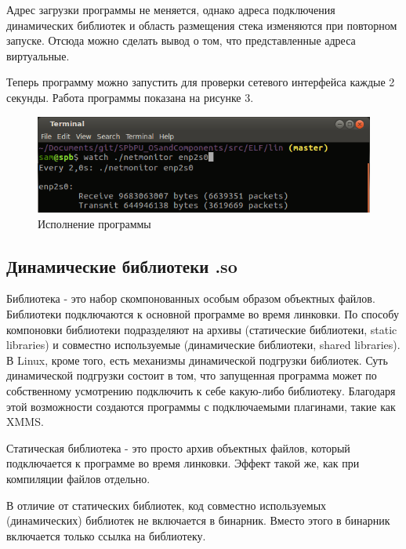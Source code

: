 

Адрес загрузки программы не меняется, однако адреса подключения динамических библиотек и область размещения стека изменяются при повторном запуске. Отсюда можно сделать вывод о том, что представленные адреса виртуальные.

Теперь программу можно запустить для проверки сетевого интерфейса каждые 2 секунды. Работа программы показана на рисунке 3.

\begin{figure}[H]
 \centering
 \includegraphics[scale=0.85]{res/lin_003}
 \caption{Исполнение программы}
\end{figure}

\subsection{Динамические библиотеки .so}

Библиотека - это набор скомпонованных особым образом объектных файлов. Библиотеки подключаются к основной программе во время линковки. По способу компоновки библиотеки подразделяют на архивы (статические библиотеки, static libraries) и совместно используемые (динамические библиотеки, shared libraries). В Linux, кроме того, есть механизмы динамической подгрузки библиотек. Суть динамической подгрузки состоит в том, что запущенная программа может по собственному усмотрению подключить к себе какую-либо библиотеку. Благодаря этой возможности создаются программы с подключаемыми плагинами, такие как XMMS.

Статическая библиотека - это просто архив объектных файлов, который подключается к программе во время линковки. Эффект такой же, как при компиляции файлов отдельно.

В отличие от статических библиотек, код совместно используемых (динамических) библиотек не включается в бинарник. Вместо этого в бинарник включается только ссылка на библиотеку.


